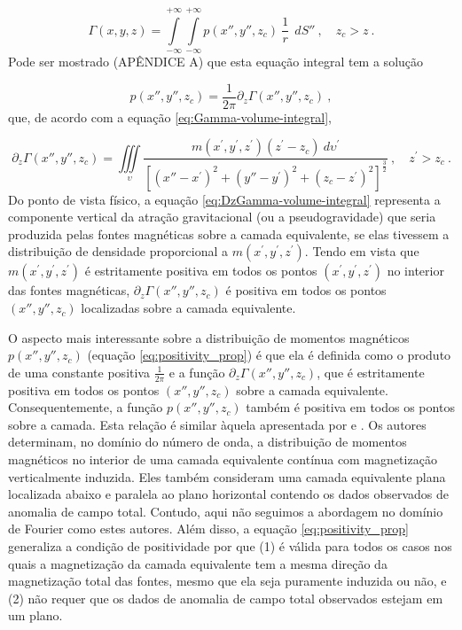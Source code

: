 \begin{equation}
\Gamma(x, y, z) = 
\int\limits_{-\infty}^{+\infty}\int\limits_{-\infty}^{+\infty}
p(x'', y'', z_{c}) \: \frac{1}{r} \:\: dS'' \: ,
\quad z_{c} > z \: .
\label{eq:Gamma_integral_equation}
\end{equation} 
Pode ser mostrado (APÊNDICE A) que esta equação integral tem a solução

\begin{equation}
p(x'', y'', z_{c}) = \frac{1}{2\pi} \partial_{z} \Gamma(x'', y'', z_{c}) \: ,
\label{eq:positivity_prop}
\end{equation}
que, de acordo com a equação \ref{eq:Gamma-volume-integral}, 

\begin{equation}
\partial_{z} \Gamma(x'', y'', z_{c}) = \iiint\limits_{\upsilon} 
\frac{m(x^{\prime}, y^{\prime}, z^{\prime}) (z^{\prime} - z_{c}) \: 
d\upsilon^{\prime}}
{\left[ (x''-x^{\prime})^2 + (y''-y^{\prime})^2 + (z_{c}-z^{\prime})^2 \right]^{\frac{3}{2}}} \: , \quad z^{\prime} > z_{c} \: .
\label{eq:DzGamma-volume-integral}
\end{equation}
Do ponto de vista físico, a equação \ref{eq:DzGamma-volume-integral} representa a componente vertical da atração gravitacional (ou a pseudogravidade) que seria produzida pelas fontes magnéticas sobre a camada equivalente, se elas tivessem a distribuição de densidade proporcional a $m(x^{\prime}, y^{\prime}, z^{\prime})$. Tendo em vista que $m(x^{\prime}, y^{\prime}, z^{\prime})$ é estritamente positiva em todos os pontos $(x^{\prime}, y^{\prime}, z^{\prime})$ no interior das fontes magnéticas, $\partial_{z} \Gamma(x'', y'', z_{c})$ é positiva em todos os pontos $(x'', y'', z_{c})$ localizadas sobre a camada equivalente.

O aspecto mais interessante sobre a distribuição de momentos magnéticos $p(x'', y'', z_{c})$ (equação \ref{eq:positivity_prop}) é que ela é definida como o produto de uma constante positiva $\frac{1}{2\pi}$ e a função $\partial_{z} \Gamma(x'',y'',z_{c})$, que é estritamente positiva em todos os pontos $(x'',y'',z_{c})$ sobre a camada equivalente. Consequentemente, a função $p(x'', y'', z_{c})$ também é positiva em todos os pontos sobre a camada. Esta relação é similar àquela apresentada por \cite{pedersen1991} e \cite{li_etal_2014}. Os autores determinam, no domínio do número de onda, a distribuição de momentos magnéticos no interior de uma camada equivalente contínua com magnetização verticalmente induzida. Eles também consideram uma camada equivalente plana localizada abaixo e paralela ao plano horizontal contendo os dados observados de anomalia de campo total. Contudo, aqui não seguimos a abordagem no domínio de Fourier como estes autores. Além disso, a equação \ref{eq:positivity_prop}  generaliza a condição de positividade por que (1) é válida para todos os casos nos quais a magnetização da camada equivalente tem a mesma direção da magnetização total das fontes, mesmo que ela seja puramente induzida ou não, e (2) não requer que os dados de anomalia de campo total observados estejam em um plano.

